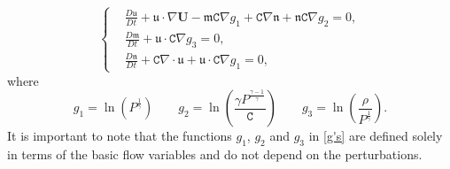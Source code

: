 \documentclass[reqno]{amsart}
\newcommand{\uu}{\boldsymbol{\mathfrak{u}}}             %
\newcommand{\m}{\mathfrak{m}}
\newcommand{\nn}{\mathfrak{n}}
\newcommand{\cs}{\texttt{C}}
\newcommand{\bu}{\mathbf{U}}             %
\begin{document}
\begin{equation}\left \{
\begin{aligned} 
  & \frac{ D\uu}{Dt}+\uu\cdot\nabla \bu-\mathfrak{m}\cs\nabla g_1 + \cs\nabla\mathfrak{n}+\mathfrak{n}\cs\nabla g_2=0,\\
  & \frac{D \m}{Dt} +\uu\cdot\cs\nabla g_3=0,\\
  & \frac{D \nn}{Dt}+\cs\nabla\cdot\uu+\uu\cdot\cs\nabla g_1=0,\label{45c}
   \end{aligned}\right.
\end{equation}  
where 
\begin{equation}\label{g's}
    g_1 =\ln\left(P^{\frac{1}{\gamma}}\right)\qquad g_2=\ln\left(\frac{\gamma P^{\frac{\gamma-1}{\gamma}}}{\cs}\right)\qquad g_3 = \ln\left(\frac{\rho}{P^{\frac{1}{\gamma}}}\right).
\end{equation}
It is important to note that the functions $g_1$, $g_2$ and $g_3$ in \eqref{g's} are defined solely in terms of the basic flow variables and do not depend on the perturbations. 
\end{document}
